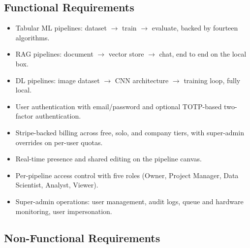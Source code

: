 \documentclass[12pt, a4paper]{report}
\begin{document}
\subsection{Functional Requirements}

\begin{itemize}
    \item Tabular ML pipelines: dataset $\to$ train $\to$ evaluate,
        backed by fourteen algorithms.
    \item RAG pipelines: document $\to$ vector store $\to$ chat, end
        to end on the local box.
    \item DL pipelines: image dataset $\to$ CNN architecture $\to$
        training loop, fully local.
    \item User authentication with email/password and optional
        TOTP-based two-factor authentication.
    \item Stripe-backed billing across free, solo, and company tiers,
        with super-admin overrides on per-user quotas.
    \item Real-time presence and shared editing on the pipeline
        canvas.
    \item Per-pipeline access control with five roles (Owner, Project
        Manager, Data Scientist, Analyst, Viewer).
    \item Super-admin operations: user management, audit logs, queue
        and hardware monitoring, user impersonation.
\end{itemize}

\subsection{Non-Functional Requirements}
\end{document}
